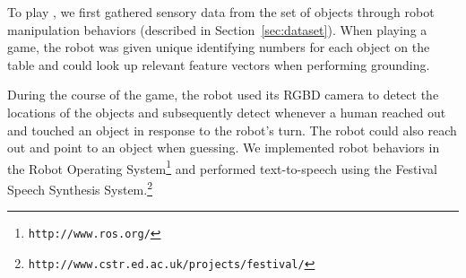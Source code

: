 To play \ispy, we first gathered sensory data from the set of objects through robot manipulation behaviors (described in Section~\ref{sec:dataset}).
When playing a game, the robot was given unique identifying numbers for each object on the table and could look up relevant feature vectors when performing grounding.

During the course of the game, the robot used its RGBD camera to detect the locations of the objects and subsequently detect whenever a human reached out and touched an object in response to the robot's turn.
The robot could also reach out and point to an object when guessing.
We implemented robot behaviors in the Robot Operating System\footnote{\texttt{http://www.ros.org/}} and performed text-to-speech using the Festival Speech Synthesis System.\footnote{\texttt{http://www.cstr.ed.ac.uk/projects/festival/}}
